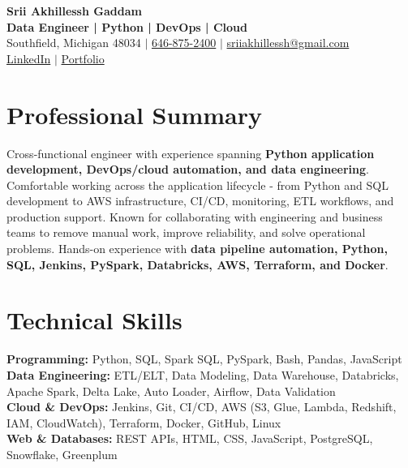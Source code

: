 \documentclass[letterpaper,10pt]{article}
\begin{document}
\fontsize{9.35pt}{10.45pt}\selectfont

\begin{center}
    {\LARGE \textbf{Srii Akhillessh Gaddam}} \\[-1pt]
    \textbf{Data Engineer | Python | DevOps | Cloud} \\[2pt]
    Southfield, Michigan 48034 $|$
    \href{tel:6468752400}{646-875-2400} $|$
    \href{mailto:sriiakhillessh@gmail.com}{sriiakhillessh@gmail.com} \\[1pt]
    \href{https://www.linkedin.com/in/srii-akhiilessh-gaddam-b48668191/}{LinkedIn} $|$
    \href{https://sriiakhillesshg.github.io/portfolio/}{Portfolio}
\end{center}
\vspace{-8pt}

\section{Professional Summary}
\small{Cross-functional engineer with experience spanning \textbf{Python application development, DevOps/cloud automation, and data engineering}. Comfortable working across the application lifecycle - from Python and SQL development to AWS infrastructure, CI/CD, monitoring, ETL workflows, and production support. Known for collaborating with engineering and business teams to remove manual work, improve reliability, and solve operational problems. Hands-on experience with \textbf{data pipeline automation, Python, SQL, Jenkins, PySpark, Databricks, AWS, Terraform, and Docker}.}

\section{Technical Skills}
\small{
\textbf{Programming:} Python, SQL, Spark SQL, PySpark, Bash, Pandas, JavaScript \\
\textbf{Data Engineering:} ETL/ELT, Data Modeling, Data Warehouse, Databricks, Apache Spark, Delta Lake, Auto Loader, Airflow, Data Validation \\
\textbf{Cloud \& DevOps:} Jenkins, Git, CI/CD, AWS (S3, Glue, Lambda, Redshift, IAM, CloudWatch), Terraform, Docker, GitHub, Linux \\
\textbf{Web \& Databases:} REST APIs, HTML, CSS, JavaScript, PostgreSQL, Snowflake, Greenplum
}
\end{document}
